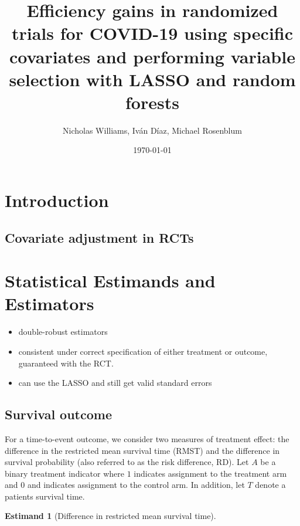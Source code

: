 \documentclass{article}
\title{
 {Efficiency gains in randomized trials for COVID-19 using specific covariates and performing variable selection with LASSO and random forests}\\
}
\author{Nicholas Williams, Iván Díaz, Michael Rosenblum}
\date{\today}
\begin{document}
\maketitle

\begin{abstract}
\end{abstract}

\section{Introduction}

\subsection{Covariate adjustment in RCTs}

\citep{covid19power}

\section{Statistical Estimands and Estimators}

\citep{vanderLaanRubin2006}
\citep{diaz2019improved}
\citep{diazOrdinal}

\begin{itemize}
  \item double-robust estimators
  \item consistent under correct specification of either treatment or outcome, guaranteed with the RCT.
  \item can use the LASSO and still get valid standard errors
\end{itemize}

\subsection{Survival outcome}

\newtheorem{surv}{Estimand}

For a time-to-event outcome, we consider two measures of treatment effect: the difference in the restricted mean survival time (RMST) and the difference in survival probability (also referred to as the risk difference, RD). Let $A$ be a binary treatment indicator where $1$ indicates assignment to the treatment arm and $0$ and indicates assignment to the control arm. In addition, let $T$ denote a patients survival time.

\begin{surv}[Difference in restricted mean survival time]
\label{rmst}
\end{surv}
\end{document}
